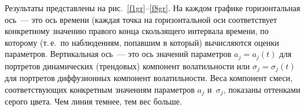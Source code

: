 \begin{multicols}{2}
Результаты представлены на рис.~\ref{f1gr}--\ref{f8gr}. На каж\-дом графике
горизонтальная ось~--- это ось времени (каждая точка на
горизонтальной оси соответствует конкретному значению правого
конца скользящего интервала времени, по которому (т.\,е.\ по
наблюдениям, попавшим в который) вычисляются оценки параметров.
Вертикальная ось~--- это ось значений параметров $a_j=a_j(t)$ для
портретов динамических (трендовых) компонент во\-ла\-тиль\-ности или
$\sigma_j=\sigma_j(t)$ для портретов диффузионных компонент
волатильности. Веса компонент смеси, соответствующих конкретным
значениям па\-ра\-мет\-ров $a_j$ и~$\sigma_j$, показаны оттенками серого
цвета. Чем линия темнее, тем вес больше.

\begin{figure*} %
\vspace*{1pt}
\begin{center}
\mbox{%
\epsfxsize=100.655mm
}
\end{center}
\vspace*{-9pt}
\end{figure*}

\begin{figure*} %
\vspace*{1pt}
\begin{center}
\mbox{%
\epsfxsize=118.368mm
}
\end{center}
\vspace*{-9pt}
\end{figure*}


\end{multicols}
